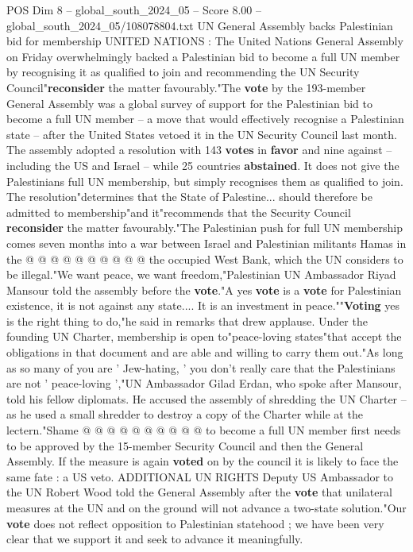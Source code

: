 \begin{textsample}{POS Dim 8 – global\_south\_2024\_05 – Score 8.00 – global\_south\_2024\_05/108078804.txt}  \label{ex:f8_pos_220}
UN General Assembly backs Palestinian bid for membership UNITED NATIONS : The United Nations General Assembly on Friday overwhelmingly backed a Palestinian bid to become a full UN member by recognising it as qualified to join and recommending the UN Security Council"\textbf{reconsider} the matter favourably."The \textbf{vote} by the 193-member General Assembly was a global survey of support for the Palestinian bid to become a full UN member -- a move that would effectively recognise a Palestinian state -- after the United States vetoed it in the UN Security Council last month.
The assembly adopted a resolution with 143 \textbf{votes} in \textbf{favor} and nine against -- including the US and Israel -- while 25 countries \textbf{abstained}.
It does not give the Palestinians full UN membership, but simply recognises them as qualified to join.
The resolution"determines that the State of Palestine... should therefore be admitted to membership"and it"recommends that the Security Council \textbf{reconsider} the matter favourably."The Palestinian push for full UN membership comes seven months into a war between Israel and Palestinian militants Hamas in the @ @ @ @ @ @ @ @ @ @ the occupied West Bank, which the UN considers to be illegal."We want peace, we want freedom,"Palestinian UN Ambassador Riyad Mansour told the assembly before the \textbf{vote}."A yes \textbf{vote} is a \textbf{vote} for Palestinian existence, it is not against any state....
It is an investment in peace.""\textbf{Voting} yes is the right thing to do,"he said in remarks that drew applause.
Under the founding UN Charter, membership is open to"peace-loving states"that accept the obligations in that document and are able and willing to carry them out."As long as so many of you are ' Jew-hating, ' you don't really care that the Palestinians are not ' peace-loving ',"UN Ambassador Gilad Erdan, who spoke after Mansour, told his fellow diplomats.
He accused the assembly of shredding the UN Charter -- as he used a small shredder to destroy a copy of the Charter while at the lectern."Shame @ @ @ @ @ @ @ @ @ @ to become a full UN member first needs to be approved by the 15-member Security Council and then the General Assembly.
If the measure is again \textbf{voted} on by the council it is likely to face the same fate : a US veto.
ADDITIONAL UN RIGHTS Deputy US Ambassador to the UN Robert Wood told the General Assembly after the \textbf{vote} that unilateral measures at the UN and on the ground will not advance a two-state solution."Our \textbf{vote} does not reflect opposition to Palestinian statehood ; we have been very clear that we support it and seek to advance it meaningfully.

\end{textsample}
